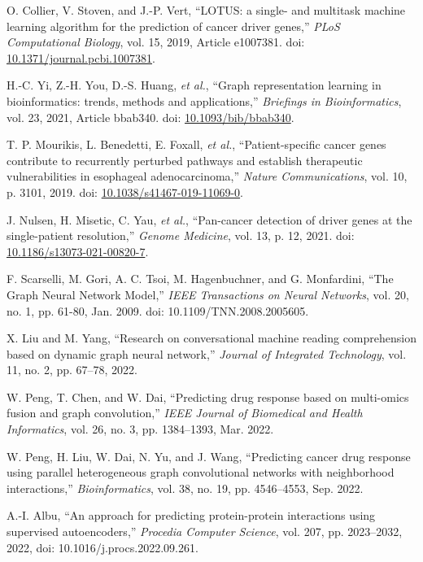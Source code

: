\documentclass[conference]{IEEEtran}
\begin{document}
\begin{thebibliography}{99}
O. Collier, V. Stoven, and J.-P. Vert, ``LOTUS: a single- and multitask machine learning algorithm for the prediction of cancer driver genes,'' \textit{PLoS Computational Biology}, vol. 15, 2019, Article e1007381. doi: \url{10.1371/journal.pcbi.1007381}.

H.-C. Yi, Z.-H. You, D.-S. Huang, \textit{et al.}, ``Graph representation learning in bioinformatics: trends, methods and applications,'' \textit{Briefings in Bioinformatics}, vol. 23, 2021, Article bbab340. doi: \url{10.1093/bib/bbab340}.

T. P. Mourikis, L. Benedetti, E. Foxall, \textit{et al.}, ``Patient-specific cancer genes contribute to recurrently perturbed pathways and establish therapeutic vulnerabilities in esophageal adenocarcinoma,'' \textit{Nature Communications}, vol. 10, p. 3101, 2019. doi: \url{10.1038/s41467-019-11069-0}.

J. Nulsen, H. Misetic, C. Yau, \textit{et al.}, ``Pan-cancer detection of driver genes at the single-patient resolution,'' \textit{Genome Medicine}, vol. 13, p. 12, 2021. doi: \url{10.1186/s13073-021-00820-7}.

F. Scarselli, M. Gori, A. C. Tsoi, M. Hagenbuchner, and G. Monfardini, ``The Graph Neural Network Model,'' \textit{IEEE Transactions on Neural Networks}, vol. 20, no. 1, pp. 61-80, Jan. 2009. doi: 10.1109/TNN.2008.2005605.


X. Liu and M. Yang, ``Research on conversational machine reading comprehension based on dynamic graph neural network,'' \textit{Journal of Integrated Technology}, vol. 11, no. 2, pp. 67–78, 2022.

W. Peng, T. Chen, and W. Dai, ``Predicting drug response based on multi-omics fusion and graph convolution,'' \textit{IEEE Journal of Biomedical and Health Informatics}, vol. 26, no. 3, pp. 1384–1393, Mar. 2022.

W. Peng, H. Liu, W. Dai, N. Yu, and J. Wang, ``Predicting cancer drug response using parallel heterogeneous graph convolutional networks with neighborhood interactions,'' \textit{Bioinformatics}, vol. 38, no. 19, pp. 4546–4553, Sep. 2022.

A.-I. Albu, ``An approach for predicting protein-protein interactions using supervised autoencoders,'' \textit{Procedia Computer Science}, vol. 207, pp. 2023–2032, 2022, doi: 10.1016/j.procs.2022.09.261.




\end{thebibliography}
\end{document}
